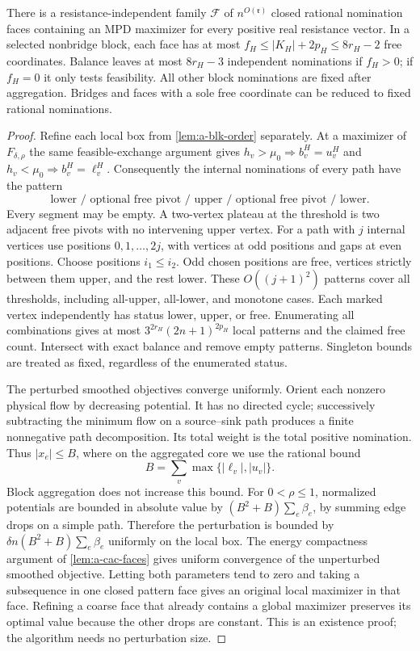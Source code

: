 \begin{lemma}
\label{lem:a-blk-faces}
There is a resistance-independent family $\mathcal F$ of
$n^{O(\mathfrak r)}$ closed rational nomination faces containing an MPD
maximizer for every positive real resistance vector. In a selected
nonbridge block, each face has at most
$f_H\le |K_H|+2p_H\le8r_H-2$ free coordinates. Balance leaves at most
$8r_H-3$ independent nominations if $f_H>0$; if $f_H=0$ it only tests
feasibility. All other block nominations are fixed after aggregation.
Bridges and faces with a sole free coordinate can be reduced to fixed
rational nominations.
\end{lemma}
\begin{proof}
Refine each local box from \cref{lem:a-blk-order} separately. At a
maximizer of $F_{\delta,\rho}$ the same feasible-exchange argument gives
$h_v>\mu_0\Rightarrow b^H_v=u^H_v$ and
$h_v<\mu_0\Rightarrow b^H_v=\ell^H_v$.
Consequently the internal nominations of every path have the pattern
\[
 \text{lower / optional free pivot / upper /
 optional free pivot / lower}.
\]
Every segment may be empty. A two-vertex plateau at the threshold is
two adjacent free pivots with no intervening upper vertex.
For a path with $j$ internal vertices use positions $0,1,\ldots,2j$,
with vertices at odd positions and gaps at even positions. Choose
positions $i_1\le i_2$. Odd chosen positions are free, vertices strictly
between them upper, and the rest lower. These $O((j+1)^2)$ patterns
cover all thresholds, including all-upper, all-lower, and monotone
cases. Each marked vertex independently has status lower, upper, or
free. Enumerating all combinations gives at most
$3^{2r_H}(2n+1)^{2p_H}$ local patterns and the claimed free count.
Intersect with exact balance and remove empty patterns. Singleton
bounds are treated as fixed, regardless of the enumerated status.

The perturbed smoothed objectives converge uniformly. Orient each
nonzero physical flow by decreasing potential. It has no directed cycle;
successively subtracting the minimum flow on a source--sink path
produces a finite nonnegative path decomposition. Its total weight is
the total positive nomination. Thus $|x_e|\le B$, where on the aggregated
core we use the rational bound
\[
 B=\sum_v\max\{|\ell_v|,|u_v|\}.
\]
Block aggregation does not increase this bound. For $0<\rho\le1$,
normalized potentials are bounded in absolute value by
$(B^2+B)\sum_e\beta_e$, by summing edge drops on a simple path.
Therefore the perturbation is bounded by
$\delta n(B^2+B)\sum_e\beta_e$ uniformly on the local box.
The energy compactness argument of \cref{lem:a-cac-faces} gives uniform
convergence of the unperturbed smoothed objective. Letting both
parameters tend to zero and taking a subsequence in one closed pattern
face gives an original local maximizer in that face. Refining a coarse
face that already contains a global maximizer preserves its optimal
value because the other drops are constant. This is an existence proof;
the algorithm needs no perturbation size.


\end{proof}
